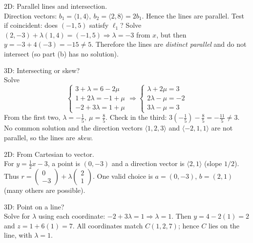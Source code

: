 \documentclass[11pt]{article}
\def\textbf#1{#1}%
\def\mathbf#1{#1}%
\begin{document}
\begin{solution}
\textbf{2D: Parallel lines and intersection.}\\
Direction vectors: \(\mathbf{b}_1=\langle1,4\rangle,\ \mathbf{b}_2=\langle2,8\rangle=2\mathbf{b}_1\).  
Hence the lines are parallel. Test if coincident: does \((-1,5)\) satisfy \(\ell_1\)?
Solve \( (2,-3)+\lambda(1,4)=(-1,5)\Rightarrow \lambda=-3\) from \(x\), but then \(y=-3+4(-3)=-15\neq5\).  
Therefore the lines are \emph{distinct parallel} and do not intersect (so part (b) has no solution).
\end{solution}

\begin{solution}
\textbf{3D: Intersecting or skew?}\\
Solve
\[
\begin{cases}
3+\lambda=6-2\mu\\
1+2\lambda=-1+\mu\\
-2+3\lambda=1+\mu
\end{cases}
\Rightarrow
\begin{cases}
\lambda+2\mu=3\\
2\lambda-\mu=-2\\
3\lambda-\mu=3
\end{cases}
\]
From the first two, \(\lambda=-\tfrac{1}{5},\ \mu=\tfrac{8}{5}\).  
Check in the third: \(3(-\tfrac{1}{5})-\tfrac{8}{5}=-\tfrac{11}{5}\neq3\).  
No common solution and the direction vectors \(\langle1,2,3\rangle\) and \(\langle-2,1,1\rangle\) are not parallel, so the lines are \emph{skew}.
\end{solution}

\begin{solution}
\textbf{2D: From Cartesian to vector.}\\
For \(y=\tfrac12 x-3\), a point is \((0,-3)\) and a direction vector is \(\langle2,1\rangle\) (slope \(1/2\)).  
Thus \(\displaystyle \mathbf{r}=\begin{pmatrix}0\\-3\end{pmatrix}+\lambda\begin{pmatrix}2\\1\end{pmatrix}\).  
One valid choice is \(\mathbf{a}=(0,-3)\), \(\mathbf{b}=(2,1)\) (many others are possible).
\end{solution}

\begin{solution}
\textbf{3D: Point on a line?}\\
Solve for \(\lambda\) using each coordinate:  
\(-2+3\lambda=1\Rightarrow \lambda=1\). Then \(y=4-2(1)=2\) and \(z=1+6(1)=7\).  
All coordinates match \(C(1,2,7)\); hence \(C\) lies on the line, with \(\lambda=1\).
\end{solution}
\end{document}
